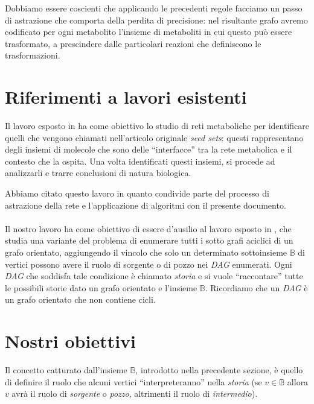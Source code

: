 Dobbiamo essere coscienti che applicando le precedenti regole facciamo
un passo di astrazione che comporta della perdita di precisione: nel
risultante grafo avremo codificato per ogni metabolito l'insieme di
metaboliti in cui questo pu\`o essere trasformato, a prescindere dalle
particolari reazioni che definiscono le trasformazioni.

\section{Riferimenti a lavori esistenti}
\label{section:existing-works}
Il lavoro esposto in \cite{large-scale-reconstruction} ha come
obiettivo lo studio di reti metaboliche per identificare quelli che
vengono chiamati nell'articolo originale \emph{seed sets}: questi
rappresentano degli insiemi di molecole che sono delle ``interfacce''
tra la rete metabolica e il contesto che la ospita. Una volta
identificati questi insiemi, si procede ad analizzarli e trarre
conclusioni di natura biologica.

Abbiamo citato questo lavoro in quanto condivide parte del processo di
astrazione della rete e l'applicazione di algoritmi con il presente
documento.
\\\\
Il nostro lavoro ha come obiettivo di essere d'ausilio al lavoro
esposto in \cite{tellingStories}, che studia una variante del problema
di enumerare tutti i sotto grafi aciclici di un grafo orientato,
aggiungendo il vincolo che solo un determinato sottoinsieme
$\mathbb{B}$ di vertici possono avere il ruolo di sorgente o di pozzo
nei \emph{DAG} enumerati. Ogni \emph{DAG} che soddisfa tale condizione
\`e chiamato \emph{storia} e si vuole ``raccontare'' tutte le
possibili storie dato un grafo orientato e l'insieme
$\mathbb{B}$. Ricordiamo che un \emph{DAG} \`e un grafo orientato che
non contiene cicli.

\section{Nostri obiettivi}
Il concetto catturato dall'insieme $\mathbb{B}$, introdotto nella
precedente sezione, \`e quello di definire il ruolo che alcuni vertici
``interpreteranno'' nella \emph{storia} (se $v \in \mathbb{B}$ allora
$v$ avr\`a il ruolo di \emph{sorgente} o \emph{pozzo}, altrimenti il
ruolo di \emph{intermedio}).

